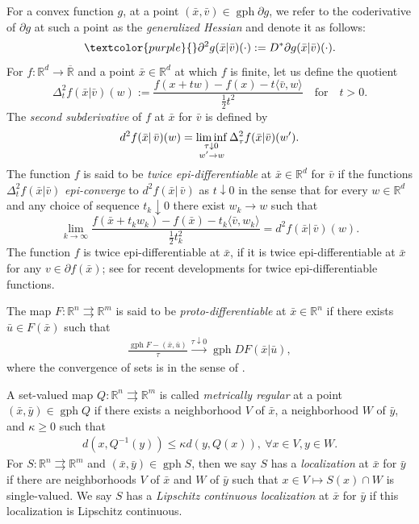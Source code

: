 \documentclass[reqno]{amsart}
\numberwithin{equation}{section}
\newcommand{\R}{\mathbb{R}}
\newcommand{\x}{\bar{x}}
\newcommand{\gph}{\operatorname{gph}}
\begin{document}
\noindent
For a convex function $g$, at a point $(\bar{x}, \bar{v}) \in \operatorname{gph} \partial g$, we refer to the coderivative of $\partial g$ at such a point as the \emph{generalized Hessian} and denote it as follows:
\[
   \textcolor{purple}{} \partial^2 g(\bar{x} | \bar{v})(\cdot) := D^* \partial g(\bar{x} | \bar{v})(\cdot).
\]
For $f : \R^d \to \overline{\R}$ and a point $\x \in \R^d$ at which $f$ is finite, let us define the quotient
 \begin{equation}
     \Delta^2_tf(\bar x|\bar v)(w):=\dfrac{f(x+tw)-f(x)-t\langle\bar v,w\rangle}{\frac{1}{2}t^2}\quad \mbox{for}\quad t>0. 
 \end{equation}
The {\em second subderivative} of $f$ at $\bar x$ for $\bar v$ is defined by 
\[
d^2 f(\bar x|\,\bar v)(w)=\liminf\limits_{ \begin{subarray}\quad \,\ \tau\downarrow 0\\
w'\rightarrow w\end{subarray}}\Delta^2_\tau f(\bar x|\bar v)(w').
\]
The function $f$  is said to be {\it twice epi-differentiable} \cite[Definition 13.6]{RoW 98} at $\bar x\in \R^d$ for $\bar v$ if the functions  $\Delta^2_tf(\bar x|\bar v)$ {\em epi-converge} to $d^2f(\bar x|\, \bar v)$ as $t\downarrow 0$ in the sense that for every $w\in \R^d$ and any choice of  sequence $t_k\downarrow 0$ there exist $w_k\to w$ such that
$$\lim_{k\to \infty}\frac{f(\bar x+t_k w_k)-f(\bar x)-t_k \langle \bar v, w_k\rangle}{ \frac{1}{2}t_k^2}= d^2f(\bar x|\, \bar v)(w).$$
The function $f$  is twice epi-differentiable at $\bar x$, if it is twice epi-differentiable at $\bar x$ for any $v\in \partial f(\bar x)$; see \cite{MS 20} for recent developments for twice epi-differentiable functions.  

The map $F : \R^n \rightrightarrows \R^m$ is said to be \emph{proto-differentiable} at $\bar x \in \R^n$ if there exists $\bar u \in F(\x)$ such that \begin{align*}
    \frac{\gph F - (\bar x, \bar u)}{\tau} \overset{\tau \downarrow 0}{\to} \gph DF(\bar x | \bar u),
\end{align*} 
where the convergence of sets is in the sense of \cite[Chapter 4B]{RoW 98}.

A set-valued map $Q : \R^{n} \rightrightarrows \R^{m}$ is called \emph{metrically regular} at a point $(\bar{x}, \bar{y}) \in \gph Q$ if
there exists a neighborhood $V$ of $\bar{x}$, a neighborhood $W$ of $\bar{y}$, and $\kappa \ge 0$
such that
\begin{align*}
    d(x, Q^{-1}(y)) \le \kappa d(y, Q(x)), \ \forall x \in V, y \in W.
\end{align*}
\noindent
For $S : \R^n \rightrightarrows \R^m$  and $(\x, \bar y) \in \gph S$, then we say $S$ has a \emph{localization} at $\x$ for $\bar y$ if there are neighborhoods $V$ of $\x$ and $W$ of $\bar y$ such that $x \in V \mapsto S(x) \cap W$ is single-valued. We say $S$ has a \emph{Lipschitz continuous localization} at $\bar x$ for $\bar y$ if this localization is Lipschitz continuous. 
\end{document}
